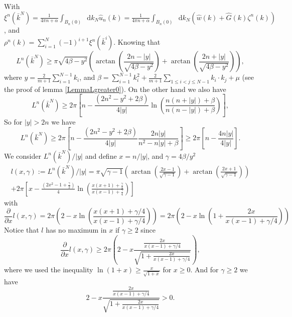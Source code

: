 \documentclass[a4paper,11pt]{article}
\newcommand{\abs}[1]{\left\lvert #1 \right\rvert}
\newcommand*\diff{\mathop{}\!\mathrm{d}}
\numberwithin{equation}{section}
\begin{document}
With $ \xi^n(\bar{k}^N)=\frac{1}{4\pi n+\alpha}\int_{B_n(0)}\diff k_N\hat{u}_n(k)=\frac{1}{4\pi n+\alpha}\int_{B_n(0)}\diff k_N \left(\hat{w}(k)+\hat{G}(k)\zeta^n(k)\right) $, and\\ $ \rho^n(k)=\sum_{i=1}^{N}(-1)^{i+1}\xi^n(\bar{k}^i) $. Knowing that \begin{equation}
L^n(\bar{k}^N)\geq\pi\sqrt{4\beta-y^2}\left(\arctan\left(\frac{2n-\abs{y}}{\sqrt{4\beta-y^2}}\right)+\arctan\left(\frac{2n+\abs{y}}{\sqrt{4\beta-y^2}}\right)\right),
\end{equation}
where $ y=\frac{2}{m+1}\sum_{i=1}^{N-1}k_i $, and $ \beta=\sum_{i=1}^{N-1}k_i^2+\frac{2}{m+1}\sum_{1\leq i<j\leq N-1}k_i\cdot k_j+\mu $ (see the proof of lemma \ref{LemmaLgreater0}). On the other hand we also have \begin{equation}
L^n(\bar{k}^N)\geq2\pi\left[n-\frac{(2n^2-y^2+2\beta)}{4\abs{y}}\ln\left(\frac{n(n+\abs{y})+\beta}{n(n-\abs{y})+\beta}\right)\right],
\end{equation}
So for $ \abs{y}>2n $ we have \begin{equation}
L^n(\bar{k}^N)\geq2\pi\left[n-\frac{(2n^2-y^2+2\beta)}{4\abs{y}}\frac{2n\abs{y}}{n^2-n\abs{y}+\beta}\right]\geq2\pi\left[n-\frac{4n\abs{y}}{4\abs{y}}\right].
\end{equation}
We consider $ L^n(\bar{k}^N)/\abs{y} $ and define $ x=n/\abs{y} $, and $ \gamma=4\beta/y^2 $\begin{equation}
\begin{aligned}
l(x,\gamma):=L^n(\bar{k}^N)/\abs{y} =\pi\sqrt{\gamma-1}\left(\arctan\left(\frac{2x-1}{\sqrt{\gamma-1}}\right)+\arctan\left(\frac{2x+1}{\sqrt{\gamma-1}}\right)\right)\\+2\pi\left[x-\frac{(2x^2-1+\frac{\gamma}{2})}{4}\ln\left(\frac{x(x+1)+\frac{\gamma}{4}}{x(x-1)+\frac{\gamma}{4}}\right)\right]
\end{aligned}
\end{equation}
with \begin{equation}
\frac{\partial}{\partial x}l(x,\gamma)=2\pi\left(2-x\ln\left(\frac{x(x+1)+\gamma/4}{x(x-1)+\gamma/4}\right)\right)=2\pi\left(2-x\ln\left(1+\frac{2x}{x(x-1)+\gamma/4}\right)\right)
\end{equation}
Notice that $ l $ has no maximum in $ x $ if $ \gamma\geq 2 $ since \begin{equation}
\frac{\partial}{\partial x}l(x,\gamma)\geq 2\pi\left(2-x\frac{\frac{2x}{x(x-1)+\gamma/4}}{\sqrt{1+\frac{2x}{x(x-1)+\gamma/4}}}\right),
\end{equation} 
where we used the inequality $ \ln(1+x)\geq\frac{x}{\sqrt{1+x}} $ for $ x\geq0 $. And for $ \gamma\geq2 $ we have \begin{equation}
2-x\frac{\frac{2x}{x(x-1)+\gamma/4}}{\sqrt{1+\frac{2x}{x(x-1)+\gamma/4}}}>0.
\end{equation} 
\end{document}
